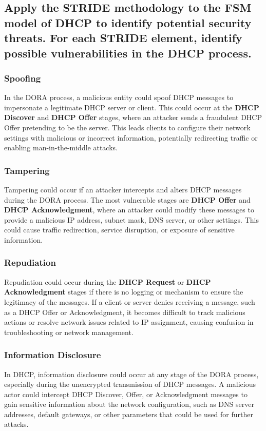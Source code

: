 \documentclass{article}
\begin{document}
\subsection{Apply the STRIDE methodology to the FSM model of DHCP to identify potential security threats.
For each STRIDE element, identify possible vulnerabilities in the DHCP process.}

\subsubsection{Spoofing}  
In the DORA process, a malicious entity could spoof DHCP messages to impersonate a legitimate DHCP server or client. This could occur at the \textbf{DHCP Discover} and \textbf{DHCP Offer} stages, where an attacker sends a fraudulent DHCP Offer pretending to be the server. This leads clients to configure their network settings with malicious or incorrect information, potentially redirecting traffic or enabling man-in-the-middle attacks.

\subsubsection{Tampering}  
Tampering could occur if an attacker intercepts and alters DHCP messages during the DORA process. The most vulnerable stages are \textbf{DHCP Offer} and \textbf{DHCP Acknowledgment}, where an attacker could modify these messages to provide a malicious IP address, subnet mask, DNS server, or other settings. This could cause traffic redirection, service disruption, or exposure of sensitive information.

\subsubsection{Repudiation}  
Repudiation could occur during the \textbf{DHCP Request} or \textbf{DHCP Acknowledgment} stages if there is no logging or mechanism to ensure the legitimacy of the messages. If a client or server denies receiving a message, such as a DHCP Offer or Acknowledgment, it becomes difficult to track malicious actions or resolve network issues related to IP assignment, causing confusion in troubleshooting or network management.

\subsubsection{Information Disclosure}  
In DHCP, information disclosure could occur at any stage of the DORA process, especially during the unencrypted transmission of DHCP messages. A malicious actor could intercept DHCP Discover, Offer, or Acknowledgment messages to gain sensitive information about the network configuration, such as DNS server addresses, default gateways, or other parameters that could be used for further attacks.
\end{document}
